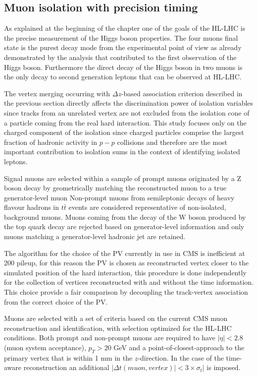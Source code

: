 \subsection{Muon isolation with precision timing}
\label{sec:muon_iso}
As explained at the beginning of the chapter one of the goals of the HL-LHC is the precise measurement
of the Higgs boson properties. The four muons final state is the purest decay mode from the experimental point of
view as already demonstrated by the analysis that contributed to the first observation of the Higgs boson.
Furthermore the direct decay of the Higgs boson in two muons is the only decay to second generation
leptons that can be observed at HL-LHC.

The vertex merging occurring with $\Delta z$-based association criterion described in the previous section
directly affects the discrimination power of isolation variables since tracks from an unrelated vertex are
not excluded from the isolation cone of a particle coming from the real hard interaction.
This study focuses only on the charged component of the isolation since charged particles comprise
the largest fraction of hadronic activity in $p-p$ collisions and therefore are the most important contribution
to isolation sums in the context of identifying isolated leptons.

Signal muons are selected within a sample of prompt muons originated by a Z boson decay by geometrically matching the reconstructed
muon to a true generator-level muon
Non-prompt muons from semileptonic decays of heavy flavour hadrons in $t\bar{t}$ events are
considered representative of non-isolated, background muons. Muons coming from the decay of the W boson produced
by the top quark decay are rejected based on generator-level information and only muons matching a generator-level
hadronic jet are retained.

The algorithm for the choice of the PV currently in use in CMS is inefficient at 200 pileup, for this reason
the PV is chosen as reconstructed vertex closer to the simulated position of the hard interaction, this procedure
is done independently for the collection of vertices reconstructed with and without the time information.
This choice provide a fair comparison by decoupling the track-vertex association from the correct choice of the PV.

Muons are selected with a set of criteria based on the current CMS muon reconstruction and identification, with
selection optimized for the HL-LHC conditions. Both prompt and non-prompt muons are required to have $|\eta|<2.8$
(muon system acceptance), $p_T > 20$ GeV and a point-of-closest-approach to the primary vertex that is within 1 mm in the
$z$-direction. In the case of the time-aware reconstruction an additional $|\Delta t(muon, vertex)| < 3\times\sigma_t|$
is imposed.


